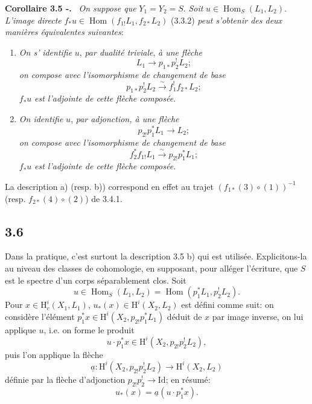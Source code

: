 \documentclass[11pt]{article}
\newenvironment{statement}[1]{\par\medskip\noindent\textbf{#1.}\ }{\par\medskip}
\renewcommand{\H}{\mathrm{H}}
\DeclareMathOperator{\Hom}{Hom}
\providecommand{\Id}{\mathrm{Id}}
\providecommand{\Hom}{\operatorname{Hom}}
\providecommand{\Hom}{\operatorname{Hom}}
\begin{document}
\begin{statement}{Corollaire 3.5 -}
\emph{On suppose que} $Y_1=Y_2=S$. \emph{Soit} $u\in\Hom_S(L_1,L_2)$. \emph{L'image directe} $f_*u\in\Hom(f_{1!}L_1,f_{2*}L_2)$ (3.3.2) \emph{peut s'obtenir des deux manières équivalentes suivantes}:
\end{statement}
\begin{enumerate}[label=\alph*)]
\item \emph{On s'}%
\emph{identifie} $u$, \emph{par dualité triviale}, \emph{à une flèche}
\[
L_1\longrightarrow p_{1*}p_2^!L_2;
\]
\emph{on compose avec l'isomorphisme de changement de base}
\[
p_{1*}p_2^!L_2\xrightarrow{\sim}f_1^!f_{2*}L_2;
\]
$f_*u$ \emph{est l'adjointe de cette flèche composée}.
\item \emph{On identifie} $u$, \emph{par adjonction, à une flèche}
\[
p_{2!}p_1^*L_1\longrightarrow L_2;
\]
\emph{on compose avec l'isomorphisme de changement de base}
\[
f_2^*f_{1!}L_1\xrightarrow{\sim}p_{2!}p_1^*L_1;
\]
$f_*u$ \emph{est l'adjointe de cette flèche composée.}
\end{enumerate}
La description a) (resp. b)) correspond en effet au trajet $(f_{1*}(3)\circ(1))^{-1}$ (resp. $f_{2*}(4)\circ(2)$) de 3.4.1.

\subsection*{3.6}
Dans la pratique, c'est surtout la description 3.5 b) qui est utilisée. Explicitons-la au niveau des classes de cohomologie, en supposant, pour alléger l'écriture, que $S$ est le spectre d'un corps séparablement clos. Soit
\[
u\in\Hom_S(L_1,L_2)=\Hom(p_1^*L_1,p_2^!L_2).
\]
Pour $x\in\H_c^i(X_1,L_1)$, $u_*(x)\in\H^i(X_2,L_2)$ est défini comme suit: on considère l'élément $p_1^*x\in\H^i(X_2,p_{2!}p_1^*L_1)$ déduit de $x$ par image inverse, on lui applique $u$, i.e. on forme le produit
\[
u\cdot p_1^*x\in \H^i(X_2,p_{2!}p_2^!L_2),
\]
puis l'on applique la flèche
\[
\underline{a}:\H^i(X_2,p_{2!}p_2^!L_2)\longrightarrow \H^i(X_2,L_2)
\]
définie par la flèche d'adjonction $p_{2!}p_2^!\to\Id$; en résumé:
\begin{equation}
u_*(x)=\underline{a}(u\cdot p_1^*x).
\tag{3.6.1}
\end{equation}
\end{document}
